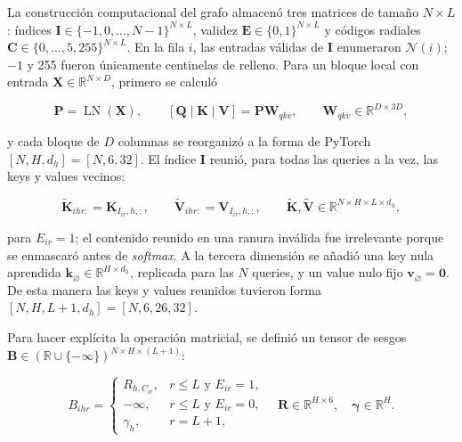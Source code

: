 La construcción computacional del grafo almacenó tres matrices de tamaño
\(N\times L\): índices
\(\mathbf I\in\{-1,0,\ldots,N-1\}^{N\times L}\), validez
\(\mathbf E\in\{0,1\}^{N\times L}\) y códigos radiales
\(\mathbf C\in\{0,\ldots,5,255\}^{N\times L}\). En la fila \(i\), las
entradas válidas de \(\mathbf I\) enumeraron \(\mathcal N(i)\); \(-1\) y 255
fueron únicamente centinelas de relleno. Para un bloque local con entrada
\(\mathbf X\in\mathbb R^{N\times D}\), primero se calculó

\begin{equation}
    \mathbf P=\operatorname{LN}(\mathbf X),\qquad
    [\mathbf Q\mid\mathbf K\mid\mathbf V]
       =\mathbf P\mathbf W_{qkv},\qquad
    \mathbf W_{qkv}\in\mathbb R^{D\times3D},
    \label{eq:proyeccion-local-empaquetada}
\end{equation}

y cada bloque de \(D\) columnas se reorganizó a la forma de PyTorch
\([N,H,d_h]=[N,6,32]\). El índice \(\mathbf I\) reunió, para todas las
queries a la vez, las keys y values vecinos:

\begin{equation}
    \widetilde{\mathbf K}_{ihr:}=\mathbf K_{I_{ir},h,:},\qquad
    \widetilde{\mathbf V}_{ihr:}=\mathbf V_{I_{ir},h,:},
    \qquad
    \widetilde{\mathbf K},\widetilde{\mathbf V}
      \in\mathbb R^{N\times H\times L\times d_h},
    \label{eq:gather-local-mil}
\end{equation}

para \(E_{ir}=1\); el contenido reunido en una ranura inválida fue irrelevante
porque se enmascaró antes de \emph{softmax}. A la tercera dimensión se añadió
una key nula aprendida
\(\mathbf k_{\varnothing}\in\mathbb R^{H\times d_h}\), replicada para las
\(N\) queries, y un value nulo fijo
\(\mathbf v_{\varnothing}=\mathbf0\). De esta manera las keys y values
reunidos tuvieron forma \([N,H,L+1,d_h]=[N,6,26,32]\).

Para hacer explícita la operación matricial, se definió un tensor de sesgos
\(\mathbf B\in(\mathbb R\cup\{-\infty\})^{N\times H\times(L+1)}\):

\begin{equation}
    B_{ihr}=\begin{cases}
      R_{h,C_{ir}}, & r\leq L\text{ y }E_{ir}=1,\\
      -\infty, & r\leq L\text{ y }E_{ir}=0,\\
      \gamma_h, & r=L+1,
    \end{cases}
    \quad
    \mathbf R\in\mathbb R^{H\times6},\quad
    \boldsymbol\gamma\in\mathbb R^H.
    \label{eq:sesgo-reunido-local-mil}
\end{equation}


